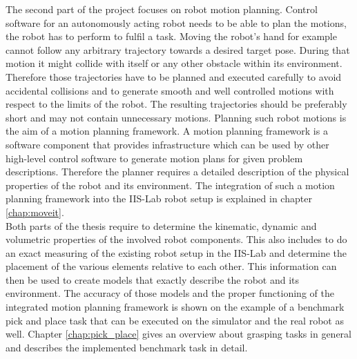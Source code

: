 The second part of the project focuses on robot motion planning. Control software for an autonomously acting robot needs to be able to plan the motions, the robot has to perform to fulfil a task. Moving the robot's hand for example cannot follow any arbitrary trajectory towards a desired target pose. During that motion it might collide with itself or any other obstacle within its environment. Therefore those trajectories have to be planned and executed carefully to avoid accidental collisions and to generate smooth and well controlled motions with respect to the limits of the robot. The resulting trajectories should be preferably short and may not contain unnecessary motions. Planning such robot motions is the aim of a motion planning framework. A motion planning framework is a software component that provides infrastructure which can be used by other high-level control software to generate motion plans for given problem descriptions. Therefore the planner requires a detailed description of the physical properties of the robot and its environment. The integration of such a motion planning framework into the IIS-Lab robot setup is explained in chapter \ref{chap:moveit}. \\

Both parts of the thesis require to determine the kinematic, dynamic and volumetric properties of the involved robot components. This also includes to do an exact measuring of the existing robot setup in the IIS-Lab and determine the placement of the various elements relative to each other. This information can then be used to create models that exactly describe the robot and its environment. The accuracy of those models and the proper functioning of the integrated motion planning framework is shown on the example of a benchmark pick and place task that can be executed on the simulator and the real robot as well. Chapter \ref{chap:pick_place} gives an overview about grasping tasks in general and describes the implemented benchmark task in detail.


